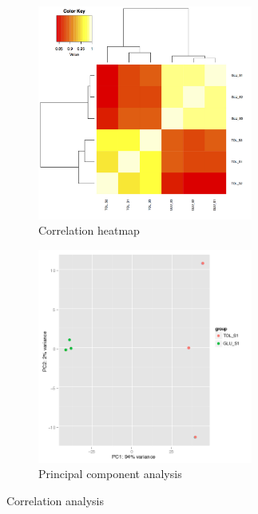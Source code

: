 \documentclass[12pt, a4paper]{report}
\begin{document}
%
%

\begin{figure}[H]
	\centering
	\begin{subfigure}{0.4\textwidth}
		\includegraphics[width=200pt]{pics/heatmap2}
		\caption{Correlation heatmap} \label{fig:heatmap}
	\end{subfigure}
	\hspace*{1cm} 
	\begin{subfigure}{0.5\textwidth}
		\includegraphics[width=200pt]{pics/PCA2}
		\caption{Principal component analysis} \label{fig:pca}
	\end{subfigure}
	\hspace*{\fill} %
	\caption{Correlation analysis} \label{fig:1}
\end{figure}
\end{document}
